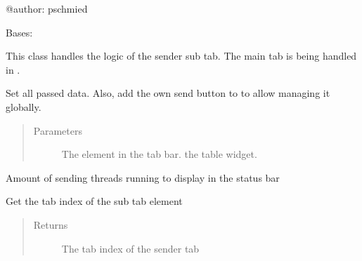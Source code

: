 \documentclass[letterpaper,10pt,english]{sphinxmanual}
\begin{document}
@author: pschmied

\begin{fulllineitems}
\label{\detokenize{src:src.SenderTabElement.SenderTabElement}}
Bases: {\hyperref[\detokenize{src:src.AbstractTab.AbstractTab}]{}}

This class handles the logic of the sender sub tab.
The main tab is being handled in {\hyperref[\detokenize{src:src.SenderTab.SenderTab}]{}}.

\begin{fulllineitems}
\label{\detokenize{src:src.SenderTabElement.SenderTabElement.__init__}}
Set all passed data. Also, add the own send button to  to
allow managing it globally.
\begin{quote}\begin{description}
\item[{Parameters}] \leavevmode
{} \textendash{} The element in the tab bar.  the table widget.

\end{description}\end{quote}

\end{fulllineitems}


\begin{fulllineitems}
\label{\detokenize{src:src.SenderTabElement.SenderTabElement.amountThreadsRunning}}
Amount of sending threads running to display in the status bar

\end{fulllineitems}


\begin{fulllineitems}
\label{\detokenize{src:src.SenderTabElement.SenderTabElement.getTabIndex}}
Get the  tab index of the sub tab element
\begin{quote}\begin{description}
\item[{Returns}] \leavevmode
The tab index of the sender tab


\end{description}
\end{quote}
\end{fulllineitems}
\end{fulllineitems}
\end{document}
